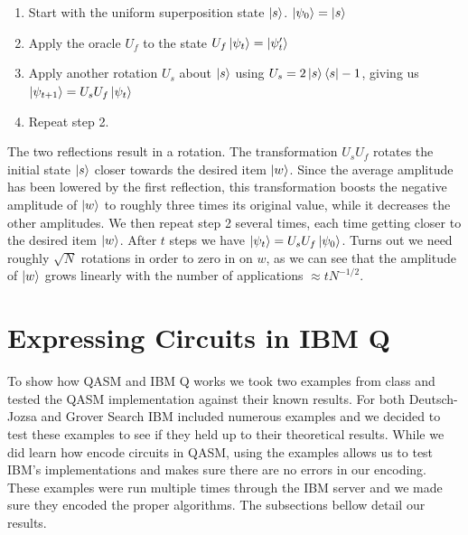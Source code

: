 \documentclass[12pt]{article}
\begin{document}
    \smallskip
    
    \begin{enumerate}
        \item  Start with the uniform superposition state $\ket{s}$. $\ket{\psi_0} = \ket{s}$
        \item Apply the oracle $U_f$ to the state $U_f \ket{\psi_t} = \ket{\psi_t'}$
        \item Apply another rotation $U_s$ about $\ket{s}$ using $U_s = 2\ket{s}\bra{s}-1$, giving us $\ket{\psi_{t+1}} = U_{s}U_{f}\ket{\psi_t}$
        \item Repeat step 2.
    \end{enumerate}
    \noindent
    The two reflections result in a rotation. The transformation $U_{s}U_f$ rotates the initial state $\ket{s}$ closer towards the desired item $\ket{w}$. Since the average amplitude has been lowered by the first reflection, this transformation boosts the negative amplitude of $\ket{w}$ to roughly three times its original value, while it decreases the other amplitudes. We then repeat step 2 several times, each time getting closer to the desired item $\ket{w}$. After $t$ steps we have $\ket{\psi_t} = U_{s}U_{f} \ket{\psi_0}$. Turns out we need roughly $\sqrt{N}$ rotations in order to zero in on $w$, as we can see that the amplitude of $\ket{w}$ grows linearly with the number of applications $\approx tN^{-1/2}$.
        
\section{Expressing Circuits in IBM Q}
    To show how QASM and IBM Q works we took two examples from class and tested the QASM implementation against their known results. For both Deutsch-Jozsa and Grover Search IBM included numerous examples and we decided to test these examples to see if they held up to their theoretical results. While we did learn how encode circuits in QASM, using the examples allows us to test IBM's implementations and makes sure there are no errors in our encoding. These examples were run multiple times through the IBM server and we made sure they encoded the proper algorithms. The subsections bellow detail our results.
    
\end{document}
